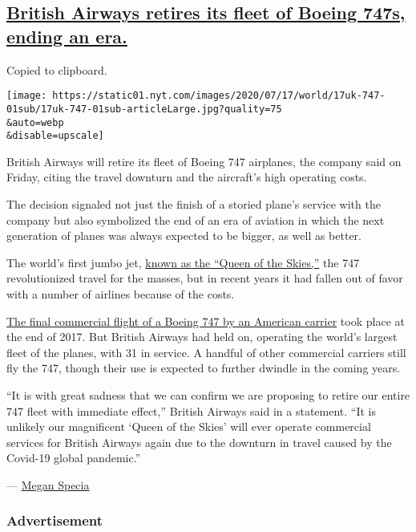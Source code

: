 \hypertarget{british-airways-retires-its-fleet-of-boeing-747s-ending-an-era}{%
\subsection{\texorpdfstring{\protect\hyperlink{british-airways-retires-its-fleet-of-boeing-747s-ending-an-era}{British
Airways retires its fleet of Boeing 747s, ending an
era.}}{British Airways retires its fleet of Boeing 747s, ending an era.}}\label{british-airways-retires-its-fleet-of-boeing-747s-ending-an-era}}

Copied to clipboard.

\texttt{[image: https://static01.nyt.com/images/2020/07/17/world/17uk-747-01sub/17uk-747-01sub-articleLarge.jpg?quality=75\\\&auto=webp\\\&disable=upscale]}

British Airways will retire its fleet of Boeing 747 airplanes, the
company said on Friday, citing the travel downturn and the aircraft's
high operating costs.

The decision signaled not just the finish of a storied plane's service
with the company but also symbolized the end of an era of aviation in
which the next generation of planes was always expected to be bigger, as
well as better.

The world's first jumbo jet,
\href{https://www.nytimes.com/2017/10/10/travel/747-airplane-jet-pilot.html}{known
as the ``Queen of the Skies,''} the 747 revolutionized travel for the
masses, but in recent years it had fallen out of favor with a number of
airlines because of the costs.

\href{https://www.nytimes.com/2018/01/19/business/747-airlines-final-flight.html}{The
final commercial flight of a Boeing 747 by an American carrier} took
place at the end of 2017. But British Airways had held on, operating the
world's largest fleet of the planes, with 31 in service. A handful of
other commercial carriers still fly the 747, though their use is
expected to further dwindle in the coming years.

``It is with great sadness that we can confirm we are proposing to
retire our entire 747 fleet with immediate effect,'' British Airways
said in a statement. ``It is unlikely our magnificent `Queen of the
Skies' will ever operate commercial services for British Airways again
due to the downturn in travel caused by the Covid-19 global pandemic.''

--- \href{https://www.nytimes.com/by/megan-specia}{Megan Specia}

\hypertarget{advertisement-2}{%
\subsubsection{Advertisement}\label{advertisement-2}}

